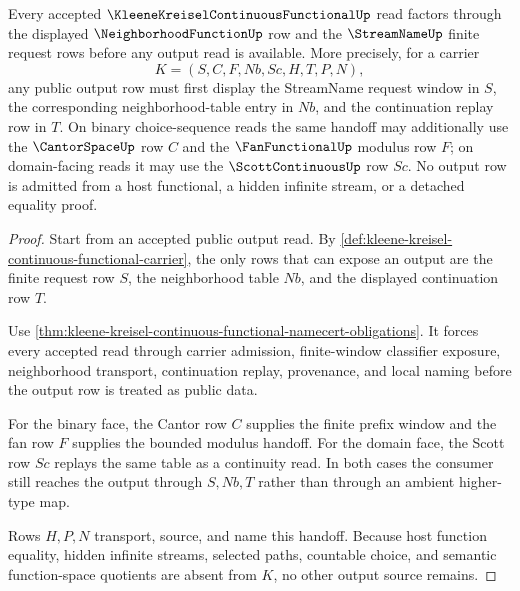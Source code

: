 \begin{theorem}
\label{thm:kleene-kreisel-continuous-functional-neighborhood-handoff}
Every accepted $\KleeneKreiselContinuousFunctionalUp$ read factors through the displayed $\NeighborhoodFunctionUp$ row and the $\StreamNameUp$ finite request rows before any output read is available. More precisely, for a carrier
$$
K=(S,C,F,Nb,Sc,H,T,P,N),
$$
any public output row must first display the StreamName request window in $S$, the corresponding neighborhood-table entry in $Nb$, and the continuation replay row in $T$. On binary choice-sequence reads the same handoff may additionally use the $\CantorSpaceUp$ row $C$ and the $\FanFunctionalUp$ modulus row $F$; on domain-facing reads it may use the $\ScottContinuousUp$ row $Sc$. No output row is admitted from a host functional, a hidden infinite stream, or a detached equality proof.
\end{theorem}
\begin{proof}
Start from an accepted public output read. By \autoref{def:kleene-kreisel-continuous-functional-carrier}, the only rows that can expose an output are the finite request row $S$, the neighborhood table $Nb$, and the displayed continuation row $T$.

Use \autoref{thm:kleene-kreisel-continuous-functional-namecert-obligations}. It forces every accepted read through carrier admission, finite-window classifier exposure, neighborhood transport, continuation replay, provenance, and local naming before the output row is treated as public data.

For the binary face, the Cantor row $C$ supplies the finite prefix window and the fan row $F$ supplies the bounded modulus handoff. For the domain face, the Scott row $Sc$ replays the same table as a continuity read. In both cases the consumer still reaches the output through $S,Nb,T$ rather than through an ambient higher-type map.

Rows $H,P,N$ transport, source, and name this handoff. Because host function equality, hidden infinite streams, selected paths, countable choice, and semantic function-space quotients are absent from $K$, no other output source remains.
\end{proof}


